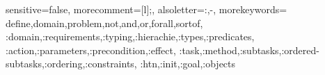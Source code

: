{
  sensitive=false,    %
  morecomment=[l]{;}, %
  alsoletter={:,-},   %
  morekeywords={
    define,domain,problem,not,and,or,forall,sortof,
    :domain,:requirements,:typing,:hierachie,:types,:predicates,
    :action,:parameters,:precondition,:effect,
    :task,:method,:subtasks,:ordered-subtasks,:ordering,:constraints,
    :htn,:init,:goal,:objects
  }
}
